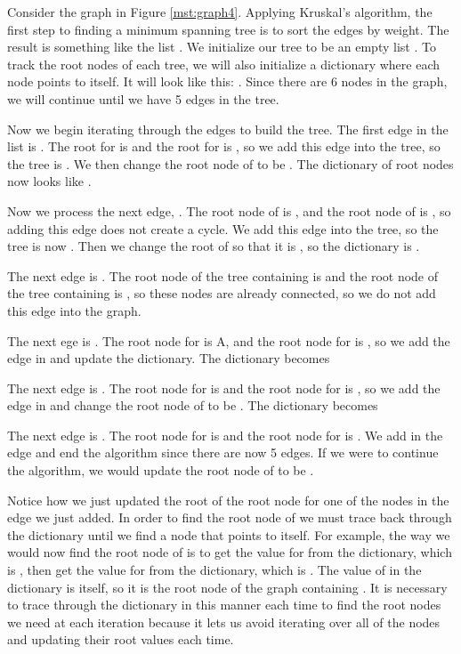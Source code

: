 Consider the graph in Figure \ref{mst:graph4}.
Applying Kruskal's algorithm, the first step to finding a minimum spanning tree is to sort the edges by weight.
The result is something like the list \li{[(C,D,1),(C,E,1),(D,E,2),(A,B,3),(B,F,4),(E,F,4),(B,C,5),(C,F,5),(A,F,6)]}.
We initialize our tree to be an empty list \li{[]}.
To track the root nodes of each tree, we will also initialize a dictionary where each node points to itself.
It will look like this: .
Since there are 6 nodes in the graph, we will continue until we have 5 edges in the tree.

Now we begin iterating through the edges to build the tree.
The first edge in the list is .
The root for  is  and the root for  is , so we add this edge into the tree, so the tree is \li{[(C,D,1)]}.
We then change the root node of  to be .
The dictionary of root nodes now looks like .

Now we process the next edge, .
The root node of  is , and the root node of  is , so adding this edge does not create a cycle.
We add this edge into the tree, so the tree is now \li{[(C,D,1),(C,E,1)]}.
Then we change the root of  so that it is , so the dictionary is .

The next edge is .
The root node of the tree containing  is  and the root node of the tree containing  is , so these nodes are already connected, so we do not add this edge into the graph.

The next ege is .
The root node for  is A, and the root node for  is , so we add the edge in and update the dictionary.
The dictionary becomes 

The next edge is .
The root node for  is  and the root node for  is , so we add the edge in and change the root node of  to be .
The dictionary becomes 

The next edge is .
The root node for  is  and the root node for  is .
We add in the edge and end the algorithm since there are now 5 edges.
If we were to continue the algorithm, we would update the root node of  to be .

Notice how we just updated the root of the root node for one of the nodes in the edge we just added.
In order to find the root node of  we must trace back through the dictionary until we find a node that points to itself.
For example, the way we would now find the root node of  is to get the value for  from the dictionary, which is , then get the value for  from the dictionary, which is .
The value of  in the dictionary is itself, so it is the root node of the graph containing .
It is necessary to trace through the dictionary in this manner each time to find the root nodes we need at each iteration because it lets us avoid iterating over all of the nodes and updating their root values each time.

